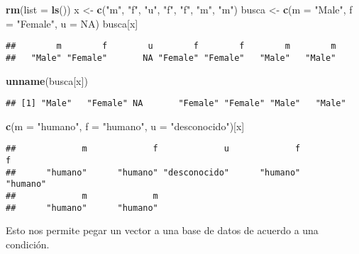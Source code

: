 \documentclass[]{article}
\newenvironment{Shaded}{\begin{snugshade}}{\end{snugshade}}
\newcommand{\KeywordTok}[1]{\textcolor[rgb]{0.13,0.29,0.53}{\textbf{#1}}}
\newcommand{\DataTypeTok}[1]{\textcolor[rgb]{0.13,0.29,0.53}{#1}}
\newcommand{\StringTok}[1]{\textcolor[rgb]{0.31,0.60,0.02}{#1}}
\newcommand{\OtherTok}[1]{\textcolor[rgb]{0.56,0.35,0.01}{#1}}
\newcommand{\NormalTok}[1]{#1}
\begin{document}
\begin{Shaded}
\begin{Highlighting}[]
\KeywordTok{rm}\NormalTok{(}\DataTypeTok{list =} \KeywordTok{ls}\NormalTok{())}
\NormalTok{x <-}\StringTok{ }\KeywordTok{c}\NormalTok{(}\StringTok{"m"}\NormalTok{, }\StringTok{"f"}\NormalTok{, }\StringTok{"u"}\NormalTok{, }\StringTok{"f"}\NormalTok{, }\StringTok{"f"}\NormalTok{, }\StringTok{"m"}\NormalTok{, }\StringTok{"m"}\NormalTok{)}
\NormalTok{busca <-}\StringTok{ }\KeywordTok{c}\NormalTok{(}\DataTypeTok{m =} \StringTok{"Male"}\NormalTok{, }\DataTypeTok{f =} \StringTok{"Female"}\NormalTok{, }\DataTypeTok{u =} \OtherTok{NA}\NormalTok{)}
\NormalTok{busca[x]}
\end{Highlighting}
\end{Shaded}

\begin{verbatim}
##        m        f        u        f        f        m        m 
##   "Male" "Female"       NA "Female" "Female"   "Male"   "Male"
\end{verbatim}

\begin{Shaded}
\begin{Highlighting}[]
\KeywordTok{unname}\NormalTok{(busca[x])}
\end{Highlighting}
\end{Shaded}

\begin{verbatim}
## [1] "Male"   "Female" NA       "Female" "Female" "Male"   "Male"
\end{verbatim}

\begin{Shaded}
\begin{Highlighting}[]
\KeywordTok{c}\NormalTok{(}\DataTypeTok{m =} \StringTok{"humano"}\NormalTok{, }\DataTypeTok{f =} \StringTok{"humano"}\NormalTok{, }\DataTypeTok{u =} \StringTok{"desconocido"}\NormalTok{)[x]}
\end{Highlighting}
\end{Shaded}

\begin{verbatim}
##             m             f             u             f             f 
##      "humano"      "humano" "desconocido"      "humano"      "humano" 
##             m             m 
##      "humano"      "humano"
\end{verbatim}

Esto nos permite pegar un vector a una base de datos de acuerdo a una
condición.
\end{document}
